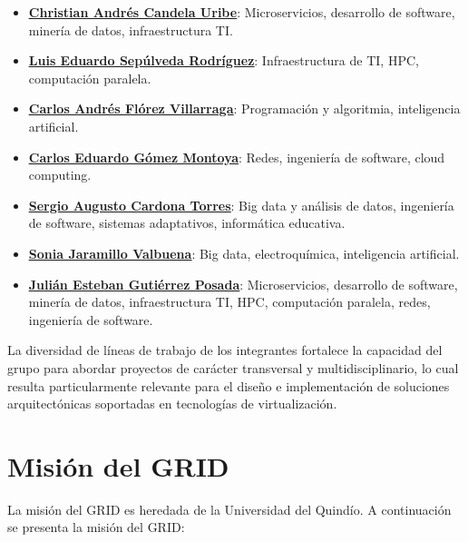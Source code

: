 \begin{itemize}
  \item \href{https://scienti.minciencias.gov.co/cvlac/visualizador/generarCurriculoCv.do?cod_rh=0000210897}{\underline{{\textbf{Christian Andrés Candela Uribe}}}}: Microservicios, desarrollo de software, minería de datos, infraestructura TI.\@
  \item \href{https://scienti.minciencias.gov.co/cvlac/visualizador/generarCurriculoCv.do?cod_rh=0001383939}{\underline{{\textbf{Luis Eduardo Sepúlveda Rodríguez}}}}: Infraestructura de TI, HPC, computación paralela.
  \item \href{https://scienti.minciencias.gov.co/cvlac/visualizador/generarCurriculoCv.do?cod_rh=0001638854}{\underline{{\textbf{Carlos Andrés Flórez Villarraga}}}}: Programación y algoritmia, inteligencia artificial.
  \item \href{https://scienti.minciencias.gov.co/cvlac/visualizador/generarCurriculoCv.do?cod_rh=0001343801}{\underline{{\textbf{Carlos Eduardo Gómez Montoya}}}}: Redes, ingeniería de software, cloud computing.
  \item \href{https://scienti.minciencias.gov.co/cvlac/visualizador/generarCurriculoCv.do?cod_rh=0001398775}{\underline{{\textbf{Sergio Augusto Cardona Torres}}}}: Big data y análisis de datos, ingeniería de software, sistemas adaptativos, informática educativa.
  \item \href{https://scienti.minciencias.gov.co/cvlac/visualizador/generarCurriculoCv.do?cod_rh=0000193550}{\underline{{\textbf{Sonia Jaramillo Valbuena}}}}: Big data, electroquímica, inteligencia artificial.
  \item \href{https://scienti.minciencias.gov.co/cvlac/visualizador/generarCurriculoCv.do?cod_rh=0000283495}{\underline{{\textbf{Julián Esteban Gutiérrez Posada}}}}: Microservicios, desarrollo de software, minería de datos, infraestructura TI, HPC, computación paralela, redes, ingeniería de software.
\end{itemize}

La diversidad de líneas de trabajo de los integrantes fortalece la capacidad del grupo para abordar proyectos de carácter transversal y multidisciplinario, lo cual resulta particularmente relevante para el diseño e implementación de soluciones arquitectónicas soportadas en tecnologías de virtualización.

\section{Misión del GRID}
La misión del GRID es heredada de la Universidad del Quindío. A continuación se presenta la misión del GRID:\@

